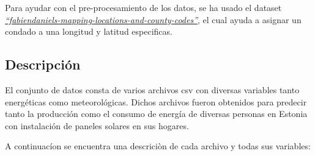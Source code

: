 \documentclass[a4paper,12pt]{article}
\begin{document}
Para ayudar con el pre-procesamiento de los datos, se ha usado el dataset
\href{https://www.kaggle.com/datasets/michaelo/fabiendaniels-mapping-locations-and-county-codes}{
    \textit{``fabiendaniels-mapping-locations-and-county-codes''}}, el cual ayuda a 
asignar un condado a una longitud y latitud especificas.

\subsection{Descripción}

El conjunto de datos consta de varios archivos csv
con diversas variables tanto energéticas como 
meteorológicas. Dichos archivos fueron obtenidos 
para predecir tanto la producción como el consumo
de energía de diversas personas en Estonia con 
instalación de paneles solares en sus hogares.

A continuacíon se encuentra una descriciòn de 
cada archivo y todas sus variables:
\end{document}
